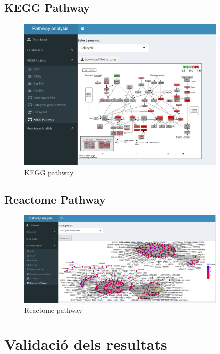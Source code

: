 \documentclass[]{article}
\begin{document}
\subsection{KEGG Pathway}


\begin{figure}[H]
\centering
\includegraphics[width=0.9\textwidth]{App_F20_Items_KEGG_KEGGPathway.png} 
\caption{KEGG pathway}
\end{figure}

\subsection{Reactome Pathway}

\begin{figure}[H]
\centering
\includegraphics[width=0.9\textwidth]{App_F21_Items_RA_RAPathway.png} 
\caption{Reactome pathway}
\end{figure}


\section{Validació dels resultats}
\label{sec:ValRes}
\end{document}

